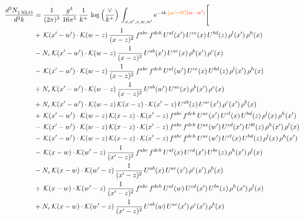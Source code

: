 \documentclass[9pt]{article}
\numberwithin{equation}{section}
\begin{document}
\begin{align}
    \frac{d^{3}N_{1\,\rm NLO}^{\rm}}{d^{3}k}  & = \frac{1}{(2\pi)^{3}}\,\frac{g^{4}}{16\pi^{5}}\,\frac{1}{k^{+}}\,\log{\left(\frac{\vee}{k^{+}}\right)}\, \int_{x,x',z,w,w'}e^{-ik\cdot{\color{orange}\cancel{(w'-w)}}{\color{red}(w-w')}}\Bigg[\notag\\ & +\,\mathcal{K}(x'-w')\cdot\mathcal{K}(w-z)\,\frac{1}{(x-z)^{2}}\,f^{abc}\,f^{deh}\,U^{al}(x')\,U^{ce}(x)\,U^{bd}(z)\,\rho^{l}(x')\,\rho^{h}(x)\notag \\ 
&-N_{c}\,\mathcal{K}(x'-w')\cdot\mathcal{K}(w-z)\,\frac{1}{(x-z)^{2}}\,U^{ab}(x')\,U^{ac}(x)\,\rho^{b}(x')\,\rho^{c}(x)\notag \\ 
&-\,\mathcal{K}(x'-w')\cdot\mathcal{K}(w-z)\,\frac{1}{(x-z)^{2}}\,f^{abc}\,f^{deh}\,U^{al}(w')\,U^{ce}(x)\,U^{bd}(z)\,\rho^{l}(x')\,\rho^{h}(x)\notag \\ 
&+N_{c}\,\mathcal{K}(x'-w')\cdot\mathcal{K}(w-z)\,\frac{1}{(x-z)^{2}}\,U^{ab}(w')\,U^{ac}(x)\,\rho^{b}(x')\,\rho^{c}(x)\notag \\ 
&+N_{c}\,\mathcal{K}(x'-w')\cdot\mathcal{K}(w-z)\,\mathcal{K}(x-z)\cdot\mathcal{K}(x'-z)\,U^{ab}(z)\,U^{ac}(x')\,\rho^{c}(x')\,\rho^{b}(x)\notag \\ 
&+\,\mathcal{K}(x'-w')\cdot\mathcal{K}(w-z)\,\mathcal{K}(x-z)\cdot\mathcal{K}(x'-z)\,f^{abc}\,f^{deh}\,U^{ae}(x')\,U^{cl}(x)\,U^{bd}(z)\,\rho^{l}(x)\,\rho^{h}(x')\notag \\ 
&-\,\mathcal{K}(x'-w')\cdot\mathcal{K}(w-z)\,\mathcal{K}(x-z)\cdot\mathcal{K}(x'-z)\,f^{abc}\,f^{deh}\,U^{ae}(w')\,U^{cd}(x')\,U^{bl}(z)\,\rho^{h}(x')\,\rho^{l}(x)\notag \\ 
&-\,\mathcal{K}(x'-w')\cdot\mathcal{K}(w-z)\,\mathcal{K}(x-z)\cdot\mathcal{K}(x'-z)\,f^{abc}\,f^{deh}\,U^{ae}(w')\,U^{cl}(x)\,U^{bd}(z)\,\rho^{l}(x)\,\rho^{h}(x')\notag \\ 
&-\,\mathcal{K}(x-w)\cdot\mathcal{K}(w'-z)\,\frac{1}{(x'-z)^{2}}\,f^{abc}\,f^{deh}\,U^{al}(x)\,U^{cd}(x')\,U^{be}(z)\,\rho^{h}(x')\,\rho^{l}(x)\notag \\ 
&-N_{c}\,\mathcal{K}(x-w)\cdot\mathcal{K}(w'-z)\,\frac{1}{(x'-z)^{2}}\,U^{ab}(x)\,U^{ac}(x')\,\rho^{c}(x')\,\rho^{b}(x)\notag \\ 
&+\,\mathcal{K}(x-w)\cdot\mathcal{K}(w'-z)\,\frac{1}{(x'-z)^{2}}\,f^{abc}\,f^{deh}\,U^{al}(w)\,U^{cd}(x')\,U^{be}(z)\,\rho^{h}(x')\,\rho^{l}(x)\notag \\ 
&+N_{c}\,\mathcal{K}(x-w)\cdot\mathcal{K}(w'-z)\,\frac{1}{(x'-z)^{2}}\,U^{ab}(w)\,U^{ac}(x')\,\rho^{c}(x')\,\rho^{b}(x)\notag \\ 

\end{align}
\end{document}
